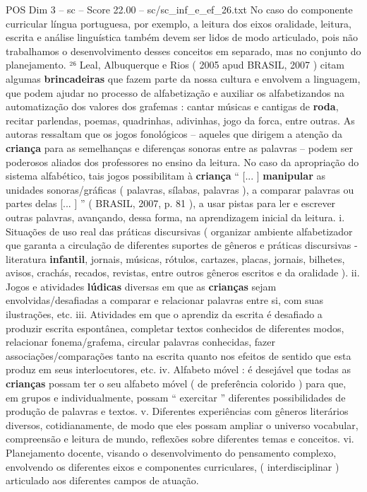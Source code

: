 \begin{textsample}{POS Dim 3 – sc – Score 22.00 – sc/sc\_inf\_e\_ef\_26.txt}
No caso do componente curricular língua portuguesa, por exemplo, a leitura dos eixos oralidade, leitura, escrita e análise linguística também devem ser lidos de modo articulado, pois não trabalhamos o desenvolvimento desses conceitos em separado, mas no conjunto do planejamento. ²⁶ Leal, Albuquerque e Rios ( 2005 apud BRASIL, 2007 ) citam algumas \textbf{brincadeiras} que fazem parte da nossa cultura e envolvem a linguagem, que podem ajudar no processo de alfabetização e auxiliar os alfabetizandos na automatização dos valores dos grafemas : cantar músicas e cantigas de \textbf{roda}, recitar parlendas, poemas, quadrinhas, adivinhas, jogo da forca, entre outras.
As autoras ressaltam que os jogos fonológicos – aqueles que dirigem a atenção da \textbf{criança} para as semelhanças e diferenças sonoras entre as palavras – podem ser poderosos aliados dos professores no ensino da leitura.
No caso da apropriação do sistema alfabético, tais jogos possibilitam à \textbf{criança} “ [... ] \textbf{manipular} as unidades sonoras/gráficas ( palavras, sílabas, palavras ), a comparar palavras ou partes delas [... ] ” ( BRASIL, 2007, p. 81 ), a usar pistas para ler e escrever outras palavras, avançando, dessa forma, na aprendizagem inicial da leitura. i.
Situações de uso real das práticas discursivas ( organizar ambiente alfabetizador que garanta a circulação de diferentes suportes de gêneros e práticas discursivas - literatura \textbf{infantil}, jornais, músicas, rótulos, cartazes, placas, jornais, bilhetes, avisos, crachás, recados, revistas, entre outros gêneros escritos e da oralidade ). ii.
Jogos e atividades \textbf{lúdicas} diversas em que as \textbf{crianças} sejam envolvidas/desafiadas a comparar e relacionar palavras entre si, com suas ilustrações, etc. iii.
Atividades em que o aprendiz da escrita é desafiado a produzir escrita espontânea, completar textos conhecidos de diferentes modos, relacionar fonema/grafema, circular palavras conhecidas, fazer associações/comparações tanto na escrita quanto nos efeitos de sentido que esta produz em seus interlocutores, etc. iv.
Alfabeto móvel : é desejável que todas as \textbf{crianças} possam ter o seu alfabeto móvel ( de preferência colorido ) para que, em grupos e individualmente, possam “ exercitar ” diferentes possibilidades de produção de palavras e textos. v.
Diferentes experiências com gêneros literários diversos, cotidianamente, de modo que eles possam ampliar o universo vocabular, compreensão e leitura de mundo, reflexões sobre diferentes temas e conceitos. vi.
Planejamento docente, visando o desenvolvimento do pensamento complexo, envolvendo os diferentes eixos e componentes curriculares, ( interdisciplinar ) articulado aos diferentes campos de atuação.

\end{textsample}

